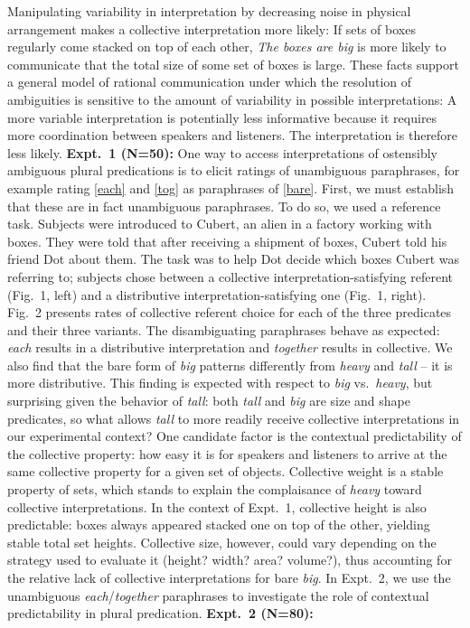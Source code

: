 \documentclass[11pt]{article}
\begin{document}
    Manipulating variability in interpretation by decreasing noise in physical arrangement makes a collective interpretation more likely: If sets of boxes regularly come stacked on top of each other, \textit{The boxes are big} is more likely to communicate that the total size of some set of boxes is large. These facts support a general model of rational communication under which the resolution of ambiguities is sensitive to the amount of variability in possible interpretations: A more variable interpretation is potentially less informative because it requires more coordination between speakers and listeners. The interpretation is therefore less likely.
\textbf{Expt.~1 (N=50):} One way to access interpretations of ostensibly ambiguous plural predications is to elicit ratings of unambiguous paraphrases, for example rating \ref{each} and \ref{tog} as paraphrases of \ref{bare}. First, we must establish that these are in fact unambiguous paraphrases. To do so, we used a reference task.
Subjects were introduced to Cubert, an alien in a factory working with boxes. They were told that after receiving a shipment of boxes, Cubert told his friend Dot about them. The task was to help Dot decide which boxes Cubert was referring to; subjects chose between a collective interpretation-satisfying referent (Fig.~1, left) and a distributive interpretation-satisfying one (Fig.~1, right). Fig.~2 presents rates of collective referent choice for each of the three predicates and their three variants. The disambiguating paraphrases behave as expected: \emph{each} results in a distributive interpretation and \emph{together} results in collective. We also find that the bare form of \emph{big} patterns differently from \emph{heavy} and \emph{tall} -- it is more distributive. This finding is expected with respect to \textit{big} vs.~\textit{heavy}, but surprising given the behavior of \textit{tall}: both \emph{tall} and \emph{big} are size and shape predicates, so what allows \emph{tall} to more readily receive collective interpretations in our experimental context?  %
One candidate factor is the contextual predictability of the collective property: how easy it is for speakers and listeners to arrive at the same collective property for a given set of objects. Collective weight is a stable property of sets, which stands to explain the complaisance of \emph{heavy} toward collective interpretations. In the context of Expt.~1, collective height is also predictable: boxes always appeared stacked one on top of the other, yielding stable total set heights. Collective size, however, could vary depending on the strategy used to evaluate it (height? width? area? volume?), thus accounting for the relative lack of collective interpretations for bare \emph{big}. In Expt.~2, we use the unambiguous \emph{each}/\emph{together} paraphrases to investigate the role of contextual predictability in plural predication. \textbf{Expt.~2 (N=80):}\linebreak
 
\end{document}
